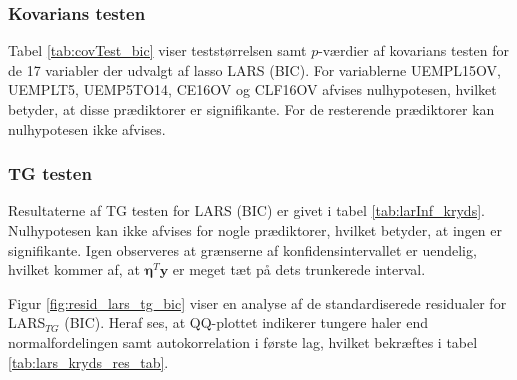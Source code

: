 \subsubsection{Kovarians testen}
Tabel \ref{tab:covTest_bic} viser teststørrelsen samt $p$-værdier af kovarians testen for de 17 variabler der udvalgt af lasso LARS (BIC). 
For variablerne  \textcolor{blue3}{UEMPL15OV}, \textcolor{blue3}{UEMPLT5}, \textcolor{blue3}{UEMP5TO14}, \textcolor{blue3}{CE16OV} og \textcolor{blue3}{CLF16OV} afvises nulhypotesen, hvilket betyder, at disse prædiktorer er signifikante. 
For de resterende prædiktorer kan nulhypotesen ikke afvises. 



\subsubsection{TG testen}
Resultaterne af TG testen for LARS (BIC) er givet i tabel \ref{tab:larInf_kryds}.
Nulhypotesen kan ikke afvises for nogle prædiktorer, hvilket betyder, at ingen er signifikante.
Igen observeres at grænserne af konfidensintervallet er uendelig, hvilket kommer af, at $\boldsymbol{\eta}^T \textbf{y}$ er meget tæt på dets trunkerede interval.



Figur \ref{fig:resid_lars_tg_bic} viser en analyse af de standardiserede residualer for LARS$_{TG}$ (BIC). 
Heraf ses, at QQ-plottet indikerer tungere haler end normalfordelingen samt autokorrelation i første lag, hvilket bekræftes i tabel \ref{tab:lars_kryds_res_tab}. 






